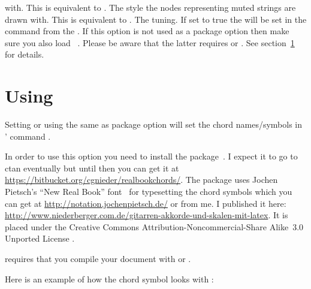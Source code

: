 \documentclass[toc=index,toc=bib]{cnpkgdoc}
\begin{document}
\begin{beschreibung}
   with. This is equivalent to .
   The \TikZ{} style the nodes representing muted strings are drawn with.
   This is equivalent to .
   The tuning.
   If set to true the  will be set in the command  from the
   . If this option is not used as a package option
   then make sure you also load ~\cite{pkg:realbookchords}.
   Please be aware that the latter requires \XeLaTeX{} or \LuaLaTeX. See
   section~\ref{sec:realbookchords} for details.
\end{beschreibung}

\section{Using }\label{sec:realbookchords}
Setting  or using the same as package option
will set the chord names/symbols in ' command .

In order to use this option you need to install the 
package~\cite{pkg:realbookchords}. I expect it to go to \ac{ctan} eventually but
until then you can get it at \url{https://bitbucket.org/cgnieder/realbookchords/}.
The package uses Jochen Pietsch's “New Real Book” font~\cite{web:pietsch:fonts}
for typesetting the chord symbols which you can get at
\url{http://notation.jochenpietsch.de/} or from me.  I published it here: \url{http://www.niederberger.com.de/gitarren-akkorde-und-skalen-mit-latex}.
It is placed under the Creative Commons Attribution-Noncommercial-Share Alike~3.0
Unported License \ccbyncsaeu.

 requires that you compile your document with \XeLaTeX{}
or \LuaLaTeX.

Here is an example of how the chord symbol looks with :
\begin{beispiel}
 \chordscheme[
   name      = Gmi7(\b5) ,
   position  = II ,
   finger    = {1/2:1, 2/3:4, 2/4:3} ,
   show-root = {4/4} ,
   root      = {2/6:2} ,
   mute      = {1,5}
 ]
\end{beispiel}

\printbibliography

\printindex
\end{document}
